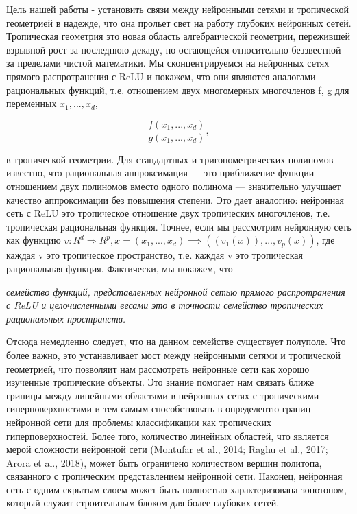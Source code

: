 \documentclass[russian]{lecture-notes}
\begin{document}
	Цель нашей работы - установить связи между нейронными сетями и тропической геометрией в надежде, что она прольет свет на работу глубоких нейронных сетей. Тропическая геометрия это новая область алгебраической геометрии, пережившей взрывной рост за последнюю декаду, но остающейся относительно беззвестной за пределами чистой математики. Мы сконцентрируемся на нейронных сетях прямого распротранения с ReLU и покажем, что они являются аналогами рациональных функций, т.е. отношением двух многомерных многочленов f, g для переменных $x_1,...,x_d$,
	
	\begin{equation*}
	\frac{f(x_1,...,x_d)}{g(x_1,...,x_d)},
	\end{equation*}
	
	в тропической геометрии. Для стандартных и тригонометрических полиномов известно, что рациональная аппроксимация --- это приближение функции отношением двух полиномов вместо одного полинома --- значительно улучшает качество аппроксимации без повышения степени. Это дает аналогию: нейронная сеть с ReLU это тропическое отношение двух тропических многочленов, т.е. тропическая рациональная функция. Точнее, если мы рассмотрим нейронную сеть как функцию $v : R^d \Rightarrow R^p, x=(x_1,...,x_d) \implies ((v_1(x)),...,v_p(x))$, где каждая v это тропическое пространство, т.е. каждая v это тропическая рациональная функция. Фактически, мы покажем, что
	
	
	\textit{семейство функций, представленных нейронной сетью прямого распротранения с ReLU и целочисленными весами это в точности семейство тропических рациональных пространств.}
	
	Отсюда немедленно следует, что на данном семействе существует полуполе. Что более важно, это устанавливает мост между нейронными сетями и тропической геометрией, что позволяит нам рассмотреть нейронные сети как хорошо изученные тропические объекты. Это знание помогает нам связать ближе гриницы между линейными областями в нейронных сетях с тропическими гиперповерхностями и тем самым способствовать в определентю границ нейронной сети для проблемы классификации как тропических гиперповерхностей. Более того, количество линейных областей, что является мерой сложности нейронной сети (Montufar et al., 2014; Raghu et al., 2017; Arora
	et al., 2018), может быть ограничено количеством вершин политопа, связанного с тропическим представлением нейронной сети. Наконец, нейронная сеть с одним скрытым слоем может быть полностью характеризована зонотопом, который служит строительным блоком для более глубоких сетей.
	
\end{document}
